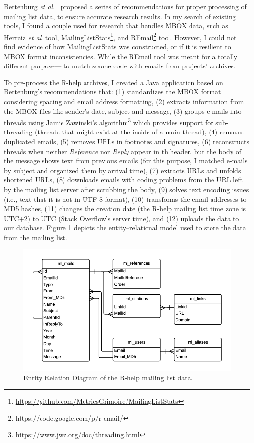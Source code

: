 \documentclass{sig-alternate-05-2015}
\begin{document}
	Bettenburg \textit{et al}.~\cite{Bettenburg2009} proposed a series of recommendations for proper processing of mailing list data, to ensure accurate research results.
	In my search of existing tools, I found a couple used for research that handles MBOX data, such as Herraiz \textit{et al}. tool, MailingListStats\footnote{\url{https://github.com/MetricsGrimoire/MailingListStats}}, and REmail\footnote{\url{https://code.google.com/p/r-email/}} tool.
	However, I could not find evidence of how MailingListStats was constructed, or if it is resilient to MBOX format inconsistencies. While the REmail tool was meant for a totally different purpose--- to match source code with emails from projects' archives.

	To pre-process the R-help archives, I created a Java application based on Bettenburg's recommendations that:
	(1) standardizes the MBOX format considering spacing and email address formatting,
	(2) extracts information from the MBOX files like sender's date, subject and message,
	(3) groups e-mails into threads using Jamie Zawinski's algorithm\footnote{\url{https://www.jwz.org/doc/threading.html}} which provides support for sub-threading (threads that might exist at the inside of a main thread),
	(4) removes duplicated emails,
	(5) removes URLs in footnotes and signatures,
	(6) reconstructs threads when neither \textit{Reference} nor \textit{Reply} appear in th header, but the body of the message shows text from previous emails (for this purpose, I matched e-mails by subject and organized them by arrival time),%
	(7) extracts URLs and unfolds shortened URLs,
	(8) downloads emails with coding problems from the URL left by the mailing list server after scrubbing the body,
	(9) solves text encoding issues (i.e., text that it is not in UTF-8 format),
	(10) transforms the email addresses to MD5 hashes,
	(11) changes the creation date (the R-help mailing list time zone is UTC+2) to UTC (Stack Overflow's server time),
	and (12) uploads the data to our database.
	Figure \ref{fig:ML-ERD} depicts the entity--relational model used to store the data from the mailing list.

	\begin{figure} [!ht]
		\centering
		\includegraphics[width=\columnwidth]{Figures/ML-ERD}
		\caption{Entity Relation Diagram of the R-help mailing list data.}
		\label{fig:ML-ERD}
	\end{figure}
\end{document}
